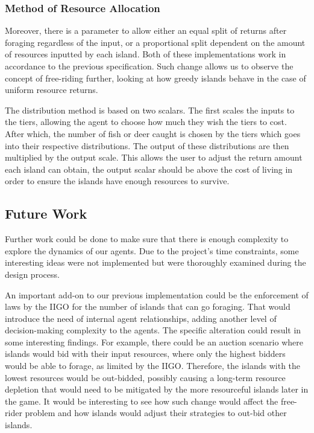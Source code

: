\subsubsection{Method of Resource Allocation}

Moreover, there is a parameter to allow either an equal split of returns after foraging regardless of the input, or a proportional split dependent on the amount of resources inputted by each island. Both of these implementations work in accordance to the previous specification. Such change allows us to observe the concept of free-riding further, looking at how greedy islands behave in the case of uniform resource returns.

The distribution method is based on two scalars. The first scales the inputs to the tiers, allowing the agent to choose how much they wish the tiers to cost. After which, the number of fish or deer caught is chosen by the tiers which goes into their respective distributions. The output of these distributions are then multiplied by the output scale. This allows the user to adjust the return amount each island can obtain, the output scalar should be above the cost of living in order to ensure the islands have enough resources to survive.  

\subsection{Future Work}

Further work could be done to make sure that there is enough complexity to explore the dynamics of our agents. Due to the project’s time constraints, some interesting ideas were not implemented but were thoroughly examined during the design process.

An important add-on to our previous implementation could be the enforcement of laws by the IIGO for the number of islands that can go foraging. That would introduce the need of internal agent relationships, adding another level of decision-making complexity to the agents. The specific alteration could result in some interesting findings. For example, there could be an auction scenario where islands would bid with their input resources, where only the highest bidders would be able to forage, as limited by the IIGO. Therefore, the islands with the lowest resources would be out-bidded, possibly causing a long-term resource depletion that would need to be mitigated by the more resourceful islands later in the game. It would be interesting to see how such change would affect the free-rider problem and how islands would adjust their strategies to out-bid other islands.


